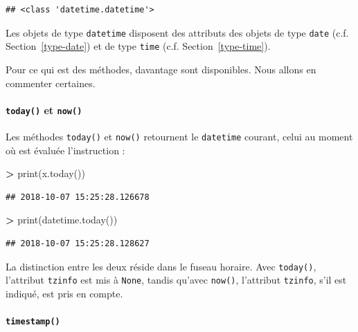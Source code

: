 \documentclass[12pt,]{book}
\newenvironment{Shaded}{\begin{snugshade}}{\end{snugshade}}
\newcommand{\OperatorTok}[1]{\textcolor[rgb]{0.81,0.36,0.00}{\textbf{#1}}}
\newcommand{\BuiltInTok}[1]{#1}
\newcommand{\NormalTok}[1]{#1}
\let\oldparagraph\paragraph
\renewcommand{\paragraph}[1]{\oldparagraph{#1}\mbox{}}
\numberwithin{equation}{section}
\numberwithin{countremarque}{section}
\begin{document}
\begin{lstlisting}
## <class 'datetime.datetime'>
\end{lstlisting}

Les objets de type \texttt{datetime} disposent des attributs des objets
de type \texttt{date} (c.f. Section~\ref{type-date}) et de type
\texttt{time} (c.f. Section~\ref{type-time}).

Pour ce qui est des méthodes, davantage sont disponibles. Nous allons en
commenter certaines.

\paragraph{\texorpdfstring{\texttt{today()} et
\texttt{now()}}{today() et now()}}\label{today-et-now}

Les méthodes \texttt{today()} et \texttt{now()} retournent le
\texttt{datetime} courant, celui au moment où est évaluée l'instruction
:

\begin{Shaded}
\begin{Highlighting}[]
\OperatorTok{>} \BuiltInTok{print}\NormalTok{(x.today())}
\end{Highlighting}
\end{Shaded}

\begin{lstlisting}
## 2018-10-07 15:25:28.126678
\end{lstlisting}

\begin{Shaded}
\begin{Highlighting}[]
\OperatorTok{>} \BuiltInTok{print}\NormalTok{(datetime.today())}
\end{Highlighting}
\end{Shaded}

\begin{lstlisting}
## 2018-10-07 15:25:28.128627
\end{lstlisting}

La distinction entre les deux réside dans le fuseau horaire. Avec
\texttt{today()}, l'attribut \texttt{tzinfo} est mis à \texttt{None},
tandis qu'avec \texttt{now()}, l'attribut \texttt{tzinfo}, s'il est
indiqué, est pris en compte.

\paragraph{\texorpdfstring{\texttt{timestamp()}}{timestamp()}}\label{timestamp}
\end{document}
